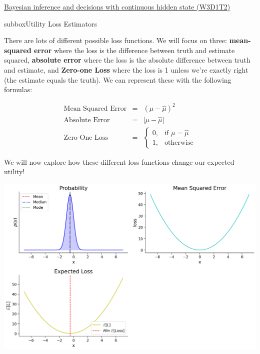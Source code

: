 \begin{textbox}{\href{https://compneuro.neuromatch.io/tutorials/W3D1_BayesianDecisions/student/W3D1_Tutorial2.html}{Bayesian inference and decisions with continuous hidden state (W3D1T2)} }
\begin{subbox}{subbox}{Utility Loss Estimators}
\scriptsize

There are lots of different possible loss functions. We will focus on three: \textbf{mean-squared error} where the loss is the difference between truth and estimate squared, \textbf{absolute error} where the loss is the absolute difference between truth and estimate, and \textbf{Zero-one Loss} where the loss is 1 unless we're exactly right (the estimate equals the truth). We can represent these with the following formulas:

\begin{eqnarray}
\textrm{Mean Squared Error} &=& (\mu - \hat{\mu})^2 \\ 
\textrm{Absolute Error} &=& \big|\mu - \hat{\mu}\big| \\ 
\textrm{Zero-One Loss} &=& \begin{cases}
                            0,& \textrm{if } \mu = \hat{\mu} \\
                            1,              & \textrm{otherwise}
                            \end{cases}
\end{eqnarray}


We will now explore how these different loss functions change our expected utility!

\begin{center}
    
\includegraphics[scale=0.22]{Figures/BD/BD_Figure8.png}
\end{center}


\end{subbox}
\end{textbox}
